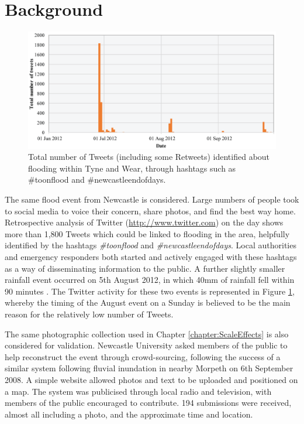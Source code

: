 \section{Background}

\begin{figure}[tpb]
	\centering
	\includegraphics[width=1.0\textwidth]{nowcasting-figures/nclsm-num-tweets.png}
	\caption{Total number of Tweets (including some Retweets) identified about flooding within Tyne and Wear, through hashtags such as \#toonflood and \#newcastleendofdays.}
	\label{NclSM-Num-Tweets}
\end{figure}

The same flood event from Newcastle is considered. Large numbers of people took to social media to voice their concern, share photos, and find the best way home. Retrospective analysis of Twitter (\url{http://www.twitter.com}) on the day shows more than 1,800 Tweets which could be linked to flooding in the area, helpfully identified by the hashtags \textit{\#toonflood} and \textit{\#newcastleendofdays}. Local authorities and emergency responders both started and actively engaged with these hashtags as a way of disseminating information to the public. A further slightly smaller rainfall event occurred on 5th August 2012, in which 40mm of rainfall fell within 90 minutes \citep{NewcastleCityCouncil2013}. The Twitter activity for these two events is represented in Figure \ref{NclSM-Num-Tweets}, whereby the timing of the August event on a Sunday is believed to be the main reason for the relatively low number of Tweets. 

The same photographic collection used in Chapter \ref{chapter:ScaleEffects} is also considered for validation. Newcastle University asked members of the public to help reconstruct the event through crowd-sourcing, following the success of a similar system following fluvial inundation in nearby Morpeth on 6th September 2008. A simple website allowed photos and text to be uploaded and positioned on a map. The system was publicised through local radio and television, with members of the public encouraged to contribute. 194 submissions were received, almost all including a photo, and the approximate time and location.

